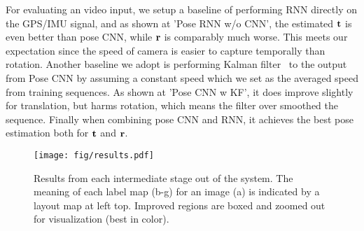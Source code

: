 For evaluating an video input, we setup a baseline of performing RNN directly on the GPS/IMU signal, and as shown at 'Pose RNN w/o CNN', the estimated ${\mathbf t}$ is even better than pose CNN, while ${\mathbf r}$ is comparably much worse. This meets our expectation since the speed of camera is easier to capture temporally than rotation. Another baseline we adopt is performing Kalman filter~\cite{kalman1960new} to the output from Pose CNN by assuming a constant speed which we set as the averaged speed from training sequences. As shown at 'Pose CNN w KF', it does improve slightly for translation, but harms rotation, which means the filter over smoothed the sequence. Finally when combining pose CNN and RNN, it achieves the best pose estimation both for ${\mathbf t}$ and ${\mathbf r}$.

\begin{figure*}
\center
\vspace{-0.3\baselineskip}
\texttt{[image: fig/results.pdf]}
   \caption{Results from each intermediate stage out of the system. The meaning of each label map (b-g) for an image (a) is indicated by a layout map at left top. Improved regions are boxed and zoomed out for visualization (best in color).}
\label{fig:results}
\vspace{-1.2\baselineskip}
\end{figure*}

